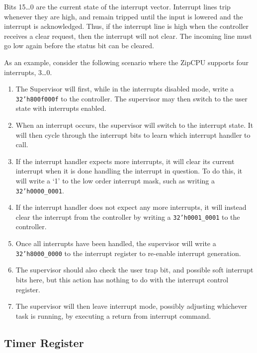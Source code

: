 \documentclass{gqtekspec}
\begin{document}
Bits 15\ldots 0 are the current state of the interrupt vector.  Interrupt lines
trip whenever they are high, and remain tripped until the input is lowered and
the interrupt is acknowledged.  Thus, if the interrupt line is high when the
controller receives a clear request, then the interrupt will not clear.
The incoming line must go low again before the status bit can be cleared.

As an example, consider the following scenario where the ZipCPU supports four
interrupts, 3\ldots0.
\begin{enumerate}
\item The Supervisor will first, while in the interrupts disabled mode,
	write a {\tt 32'h800f000f} to the controller.  The supervisor may then
	switch to the user state with interrupts enabled.
\item When an interrupt occurs, the supervisor will switch to the interrupt
	state.  It will then cycle through the interrupt bits to learn which
	interrupt handler to call.
\item If the interrupt handler expects more interrupts, it will clear its
	current interrupt when it is done handling the interrupt in question.
	To do this, it will write a `1' to the low order interrupt mask,
	such as writing a {\tt 32'h0000\_0001}.
\item If the interrupt handler does not expect any more interrupts, it will
	instead clear the interrupt from the controller by writing a 
	{\tt 32'h0001\_0001} to the controller.
\item Once all interrupts have been handled, the supervisor will write a
	{\tt 32'h8000\_0000} to the interrupt register to re-enable interrupt
	generation.
\item The supervisor should also check the user trap bit, and possible soft
	interrupt bits here, but this action has nothing to do with the
	interrupt control register.
\item The supervisor will then leave interrupt mode, possibly adjusting
	whichever task is running, by executing a return from interrupt
	command.
\end{enumerate}

\subsection{Timer Register}\label{sec:reg-timer}
\end{document}
